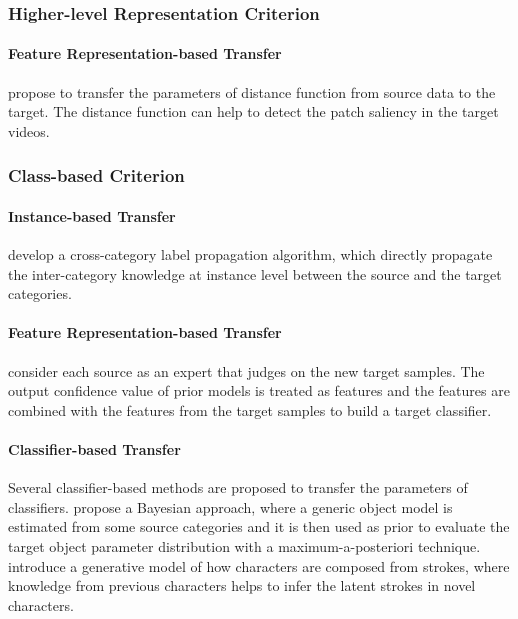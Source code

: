 \documentclass[prodmode]{acmsmall}  %
\begin{document}
\subsubsection{Higher-level Representation Criterion}
\paragraph{Feature Representation-based Transfer} 
 propose to transfer the parameters of distance function from source data to the target. The distance function can help to detect the patch saliency in the target videos.  

\subsubsection{Class-based Criterion}
\paragraph{Instance-based Transfer}
 develop a cross-category label propagation algorithm, which directly propagate the inter-category knowledge at instance level between the source and the target categories. %
\paragraph{Feature Representation-based Transfer}
 consider each source as an expert that judges on the new target samples. The output confidence value of prior models is treated as features and the features are combined with the features from the target samples to build a target classifier.

\paragraph{Classifier-based Transfer}
Several classifier-based methods are proposed to transfer the parameters of classifiers.  propose a Bayesian approach, where a generic object model is estimated from some source categories and it is then used as prior to evaluate the target object parameter distribution with a maximum-a-posteriori technique.  introduce a generative model of how characters are composed from strokes, where knowledge from previous characters helps to infer the latent strokes in novel characters.
\end{document}
